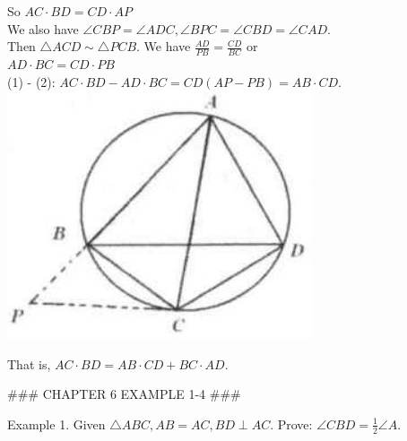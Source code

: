 \documentclass[10pt]{article}
\begin{document}
So \(A C \cdot B D=C D \cdot A P\)\\
We also have \(\angle C B P=\angle A D C, \angle B P C=\angle C B D=\angle C A D\).\\
Then \(\triangle A C D \sim \triangle P C B\). We have \(\frac{A D}{P B}=\frac{C D}{B C}\) or\\
\(A D \cdot B C=C D \cdot P B\)\\
(1) - (2): \(A C \cdot B D-A D \cdot B C=C D(A P-P B)=A B \cdot C D\).\\
\includegraphics[max width=\textwidth, center]{2025_04_17_97bc1f7e44d93c271a88g-193(1)}

That is, \(A C \cdot B D=A B \cdot C D+B C \cdot A D\).


### CHAPTER 6 EXAMPLE 1-4 ###

Example 1. Given \(\triangle A B C, A B=A C, B D \perp A C\). Prove: \(\angle C B D=\frac{1}{2} \angle A\).
\end{document}
